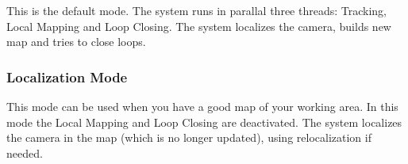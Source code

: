 This is the default mode. The system runs in parallal three threads\+: Tracking, Local Mapping and Loop Closing. The system localizes the camera, builds new map and tries to close loops.

\subsubsection*{Localization Mode}

This mode can be used when you have a good map of your working area. In this mode the Local Mapping and Loop Closing are deactivated. The system localizes the camera in the map (which is no longer updated), using relocalization if needed. 